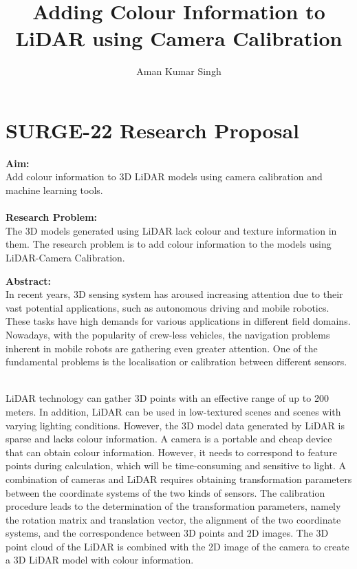 \documentclass[11pt]{extarticle}
\begin{document}
\large{\title{ Adding Colour Information to LiDAR using Camera Calibration}}
\author{Aman Kumar Singh}
\date{}

\maketitle
\large{
\section*{SURGE-22 Research Proposal}
\vspace{4mm}

\textbf{Aim:}
\\Add colour information to 3D LiDAR models using camera calibration and machine learning tools.
\\

\hspace{-5mm}\\\textbf{Research Problem:}
\justifying\\The 3D models generated using LiDAR lack colour and texture information in them. The research problem is to add colour information to the models using LiDAR-Camera Calibration.
\vspace{2mm}

\hspace{-5mm}\textbf{Abstract:}
\justifying\\In recent years, 3D sensing system has aroused increasing attention due to their vast potential applications, such as autonomous driving and mobile robotics. These tasks have high demands for various applications in different field domains. Nowadays, with the popularity of crew-less vehicles, the navigation problems inherent in mobile robots are gathering even greater attention. One of the fundamental problems is the localisation or calibration between different sensors. 

\justifying\\LiDAR technology can gather 3D points with an effective range of up to 200 meters. In addition, LiDAR can be used in low-textured scenes and scenes with varying lighting conditions. However, the 3D model data generated by LiDAR is sparse and lacks colour information. A camera is a portable and cheap device that can obtain colour information. However, it needs to correspond to feature points during calculation, which will be time-consuming and sensitive to light. A combination of cameras and LiDAR requires obtaining transformation parameters between the coordinate systems of the two kinds of sensors. The calibration procedure leads to the determination of the transformation parameters, namely the rotation matrix and translation vector, the alignment of the two coordinate systems, and the correspondence between 3D points and 2D images. The 3D point cloud of the LiDAR is combined with the 2D image of the camera to create a 3D LiDAR model with colour information.
\vspace{2mm}

}
\end{document}
